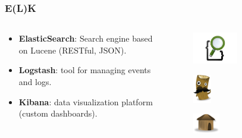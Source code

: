 \documentclass[hyperref={pdfpagelabels=true}]{beamer}
\begin{document}
\begin{frame}
\frametitle{E(L)K}
\begin{columns}
  \begin{column}{0.5\textwidth}
  \begin{itemize}
    \item<1->\textbf{ElasticSearch}: Search engine based on Lucene (RESTful, JSON).
    \item<2->\textbf{Logstash}: tool for managing events and logs.
    \item<3->\textbf{Kibana}: data visualization platform (custom dashboards).
  \end{itemize}
  \end{column}  
  \begin{column}{0.5\textwidth}
      \begin{figure}  
	\includegraphics[width=0.5\textwidth]{es.jpeg}
       \end{figure}  
      \begin{figure}  
	\includegraphics[width=0.2\textwidth]{logstash.png}
       \end{figure}         
      \begin{figure}  
	\includegraphics[width=0.3\textwidth]{kibana.png}
       \end{figure}  
  \end{column}    
\end{columns}
\end{frame}
\end{document}
